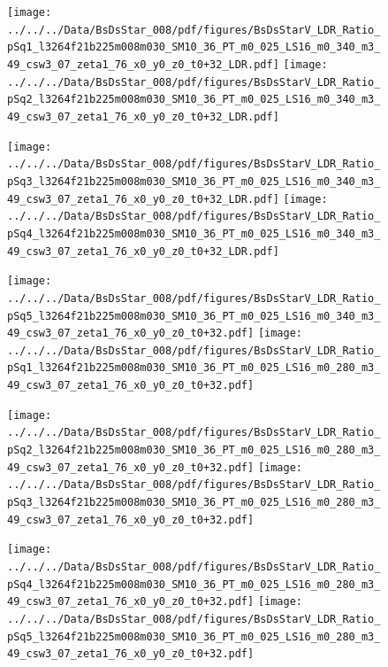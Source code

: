 \documentclass[a4paper,10pt]{article}
\begin{document}
\begin{figure}[p]
 \texttt{[image: ../../../Data/BsDsStar\_008/pdf/figures/BsDsStarV\_LDR\_Ratio\_pSq1\_l3264f21b225m008m030\_SM10\_36\_PT\_m0\_025\_LS16\_m0\_340\_m3\_49\_csw3\_07\_zeta1\_76\_x0\_y0\_z0\_t0+32\_LDR.pdf]} 
 \texttt{[image: ../../../Data/BsDsStar\_008/pdf/figures/BsDsStarV\_LDR\_Ratio\_pSq2\_l3264f21b225m008m030\_SM10\_36\_PT\_m0\_025\_LS16\_m0\_340\_m3\_49\_csw3\_07\_zeta1\_76\_x0\_y0\_z0\_t0+32\_LDR.pdf]} 
 \end{figure}
\begin{figure}[p]
 \texttt{[image: ../../../Data/BsDsStar\_008/pdf/figures/BsDsStarV\_LDR\_Ratio\_pSq3\_l3264f21b225m008m030\_SM10\_36\_PT\_m0\_025\_LS16\_m0\_340\_m3\_49\_csw3\_07\_zeta1\_76\_x0\_y0\_z0\_t0+32\_LDR.pdf]} 
 \texttt{[image: ../../../Data/BsDsStar\_008/pdf/figures/BsDsStarV\_LDR\_Ratio\_pSq4\_l3264f21b225m008m030\_SM10\_36\_PT\_m0\_025\_LS16\_m0\_340\_m3\_49\_csw3\_07\_zeta1\_76\_x0\_y0\_z0\_t0+32\_LDR.pdf]} 
 \end{figure}
\begin{figure}[p]
 \texttt{[image: ../../../Data/BsDsStar\_008/pdf/figures/BsDsStarV\_LDR\_Ratio\_pSq5\_l3264f21b225m008m030\_SM10\_36\_PT\_m0\_025\_LS16\_m0\_340\_m3\_49\_csw3\_07\_zeta1\_76\_x0\_y0\_z0\_t0+32.pdf]} 
 \texttt{[image: ../../../Data/BsDsStar\_008/pdf/figures/BsDsStarV\_LDR\_Ratio\_pSq1\_l3264f21b225m008m030\_SM10\_36\_PT\_m0\_025\_LS16\_m0\_280\_m3\_49\_csw3\_07\_zeta1\_76\_x0\_y0\_z0\_t0+32.pdf]} 
 \end{figure}
\clearpage
\begin{figure}[p]
 \texttt{[image: ../../../Data/BsDsStar\_008/pdf/figures/BsDsStarV\_LDR\_Ratio\_pSq2\_l3264f21b225m008m030\_SM10\_36\_PT\_m0\_025\_LS16\_m0\_280\_m3\_49\_csw3\_07\_zeta1\_76\_x0\_y0\_z0\_t0+32.pdf]} 
 \texttt{[image: ../../../Data/BsDsStar\_008/pdf/figures/BsDsStarV\_LDR\_Ratio\_pSq3\_l3264f21b225m008m030\_SM10\_36\_PT\_m0\_025\_LS16\_m0\_280\_m3\_49\_csw3\_07\_zeta1\_76\_x0\_y0\_z0\_t0+32.pdf]} 
 \end{figure}
\begin{figure}[p]
 \texttt{[image: ../../../Data/BsDsStar\_008/pdf/figures/BsDsStarV\_LDR\_Ratio\_pSq4\_l3264f21b225m008m030\_SM10\_36\_PT\_m0\_025\_LS16\_m0\_280\_m3\_49\_csw3\_07\_zeta1\_76\_x0\_y0\_z0\_t0+32.pdf]} 
 \texttt{[image: ../../../Data/BsDsStar\_008/pdf/figures/BsDsStarV\_LDR\_Ratio\_pSq5\_l3264f21b225m008m030\_SM10\_36\_PT\_m0\_025\_LS16\_m0\_280\_m3\_49\_csw3\_07\_zeta1\_76\_x0\_y0\_z0\_t0+32.pdf]} 
 \end{figure}
\clearpage
\end{document}
